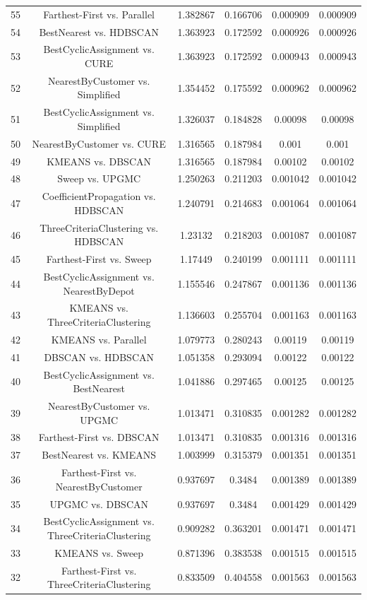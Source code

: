 \documentclass[a4paper,10pt]{article}
\begin{document}
\begin{landscape}
\begin{table}[!htp]
\begin{tabular}{cccccc}
55&Farthest-First vs. Parallel&1.382867&0.166706&0.000909&0.000909\\
54&BestNearest vs. HDBSCAN&1.363923&0.172592&0.000926&0.000926\\
53&BestCyclicAssignment vs. CURE&1.363923&0.172592&0.000943&0.000943\\
52&NearestByCustomer vs. Simplified&1.354452&0.175592&0.000962&0.000962\\
51&BestCyclicAssignment vs. Simplified&1.326037&0.184828&0.00098&0.00098\\
50&NearestByCustomer vs. CURE&1.316565&0.187984&0.001&0.001\\
49&KMEANS vs. DBSCAN&1.316565&0.187984&0.00102&0.00102\\
48&Sweep vs. UPGMC&1.250263&0.211203&0.001042&0.001042\\
47&CoefficientPropagation vs. HDBSCAN&1.240791&0.214683&0.001064&0.001064\\
46&ThreeCriteriaClustering vs. HDBSCAN&1.23132&0.218203&0.001087&0.001087\\
45&Farthest-First vs. Sweep&1.17449&0.240199&0.001111&0.001111\\
44&BestCyclicAssignment vs. NearestByDepot&1.155546&0.247867&0.001136&0.001136\\
43&KMEANS vs. ThreeCriteriaClustering&1.136603&0.255704&0.001163&0.001163\\
42&KMEANS vs. Parallel&1.079773&0.280243&0.00119&0.00119\\
41&DBSCAN vs. HDBSCAN&1.051358&0.293094&0.00122&0.00122\\
40&BestCyclicAssignment vs. BestNearest&1.041886&0.297465&0.00125&0.00125\\
39&NearestByCustomer vs. UPGMC&1.013471&0.310835&0.001282&0.001282\\
38&Farthest-First vs. DBSCAN&1.013471&0.310835&0.001316&0.001316\\
37&BestNearest vs. KMEANS&1.003999&0.315379&0.001351&0.001351\\
36&Farthest-First vs. NearestByCustomer&0.937697&0.3484&0.001389&0.001389\\
35&UPGMC vs. DBSCAN&0.937697&0.3484&0.001429&0.001429\\
34&BestCyclicAssignment vs. ThreeCriteriaClustering&0.909282&0.363201&0.001471&0.001471\\
33&KMEANS vs. Sweep&0.871396&0.383538&0.001515&0.001515\\
32&Farthest-First vs. ThreeCriteriaClustering&0.833509&0.404558&0.001563&0.001563\\

\end{tabular}
\end{table}
\end{landscape}
\end{document}
